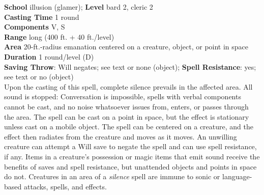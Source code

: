 \textbf{School }illusion (glamer); \textbf{Level }bard 2, cleric 2\\
\textbf{Casting Time }1 round\\
\textbf{Components }V, S\\
\textbf{Range }long (400 ft. + 40 ft./level)\\
\textbf{Area }20-ft.-radius emanation centered on a creature, object, or point in space\\
\textbf{Duration }1 round/level (D)\\
\textbf{Saving Throw}: Will negates; see text or none (object); \textbf{Spell Resistance}: yes; see text or no (object)\\
Upon the casting of this spell, complete silence prevails in the affected area. All sound is stopped: Conversation is impossible, spells with verbal components cannot be cast, and no noise whatsoever issues from, enters, or passes through the area. The spell can be cast on a point in space, but the effect is stationary unless cast on a mobile object. The spell can be centered on a creature, and the effect then radiates from the creature and moves as it moves. An unwilling creature can attempt a Will save to negate the spell and can use spell resistance, if any. Items in a creature's possession or magic items that emit sound receive the benefits of saves and spell resistance, but unattended objects and points in space do not. Creatures in an area of a \textit{silence }spell are immune to sonic or language-based attacks, spells, and effects.\\
